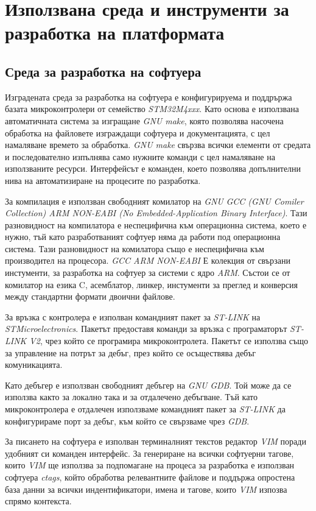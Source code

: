 \section{Използвана среда и инструменти за разработка на платформата}

\FloatBarrier
\subsection{Среда за разработка на софтуера}
\FloatBarrier

Изградената среда за разработка на софтуера е конфигурируема и поддрържа базата микроконтролери от семейство \textit{STM32M4xxx}.
Като основа е използвана автоматичната система за изгращане \textit{GNU make}, която позволява насочена обработка на файловете изграждащи софтуера и
документацията, с цел намаляване времето за обработка. \textit{GNU make} свързва всички елементи от средата и последователно изпълнява само нужните
команди с цел намаляване на използваните ресурси. Интерфейсът е команден, което позволява допълнителни нива на автоматизиране на процесите по разработка.

За компилация е използван свободният комилатор на \textit{GNU} 
\textit{GCC (GNU Comiler Collection) ARM NON-EABI (No Embedded-Application Binary Interface)}. Тази разновидност на компилатора е неспецифична към
операционна система, което е нужно, тъй като разработваният софтуер няма да работи под операционна система. Тази разновидност на комилатора също е
неспецифична към производител на процесора.
\textit{GCC ARM NON-EABI} Е колекция от свързани инстументи, за разработка на софтуер за системи с ядро \textit{ARM}.
Състои се от комилатор на езика C, асемблатор, линкер, инстументи за преглед и конверсия между стандартни формати двоични файлове.

За връзка с контролера е изполван командният пакет за \textit{ST-LINK} на \textit{STMicroelectronics}.
Пакетът предоставя команди за връзка с програматорът \textit{ST-LINK V2}, чрез който се програмира микроконтролета.
Пакетът се използва също за управление на потрът за дебъг, през който се осъществява дебъг комуникацията.

Като дебъгер е използван свободният дебъгер на \textit{GNU}
\textit{GDB}. Той може да се използва както за локално така и за отдалечено дебъгване.
Тъй като микроконтролера е отдалечен използваме командният пакет за \textit{ST-LINK} да конфигурираме порт за дебъг,
към който се свързваме чрез \textit{GDB}.

За писането на софтуера е изполван терминалният текстов редактор \textit{VIM} поради удобният си команден интерфейс.
За генериране на всички софтуерни тагове, които \textit{VIM} ще използва за подпомагане на процеса за разработка 
е използван софтуера \textit{ctags}, който обработва релевантните файлове и поддържа опростена база данни за всички индентификатори,
имена и тагове, които \textit{VIM} изпозва спрямо контекста.

